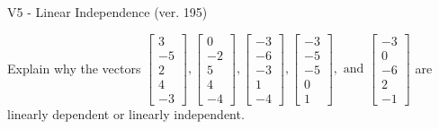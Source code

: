 \begin{exercise}
  \begin{exerciseTitle}V5 - Linear Independence (ver. 195)\end{exerciseTitle}
  \begin{exerciseStatement}
    Explain why the vectors \(\left[\begin{array}{r}
3 \\
-5 \\
2 \\
4 \\
-3
\end{array}\right] , \left[\begin{array}{r}
0 \\
-2 \\
5 \\
4 \\
-4
\end{array}\right] , \left[\begin{array}{r}
-3 \\
-6 \\
-3 \\
1 \\
-4
\end{array}\right] , \left[\begin{array}{r}
-3 \\
-5 \\
-5 \\
0 \\
1
\end{array}\right] , \text{ and } \left[\begin{array}{r}
-3 \\
0 \\
-6 \\
2 \\
-1
\end{array}\right]\) are linearly dependent or linearly independent.	



\end{exerciseStatement}
\end{exercise}
